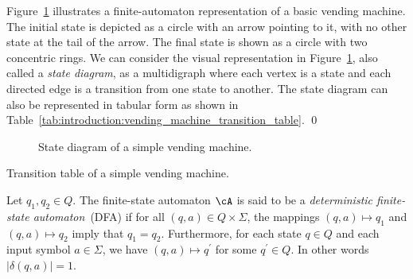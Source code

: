 \begin{example}
\rm
Figure~\ref{fig:introduction:vending_machine_state_diagram}
illustrates a finite-automaton representation of a basic vending
machine. The initial state is depicted as a circle with an arrow
pointing to it, with no other state at the tail of the arrow. The
final state is shown as a circle with two concentric rings. We can
consider the visual representation in
Figure~\ref{fig:introduction:vending_machine_state_diagram}, also
called a \emph{state diagram}, as a
multidigraph where each vertex is a state and each
directed edge is a transition from one state to another. The state
diagram can also be represented in tabular form as shown in
Table~\ref{tab:introduction:vending_machine_transition_table}. \qed
\end{example}

\begin{figure}[!htbp]
\centering
{}

\caption{State diagram of a simple vending machine.}
\label{fig:introduction:vending_machine_state_diagram}
\end{figure}

\begin{table}
\centering
{}

\caption{Transition table of a simple vending machine.}
\label{tab:introduction:vending_machine_transition_table}
\end{table}

Let $q_1, q_2 \in Q$. The finite-state automaton $\cA$ is said to be a
\emph{deterministic finite-state automaton}~(DFA)
if for all
$(q,a) \in Q \times \Sigma$, the mappings $(q,a) \mapsto q_1$ and
$(q,a) \mapsto q_2$ imply that $q_1 = q_2$. Furthermore, for each
state $q \in Q$ and each input symbol $a \in \Sigma$, we have
$(q,a) \mapsto q^\prime$ for some $q^\prime \in Q$. In other words
$|\delta(q,a)| = 1$.

